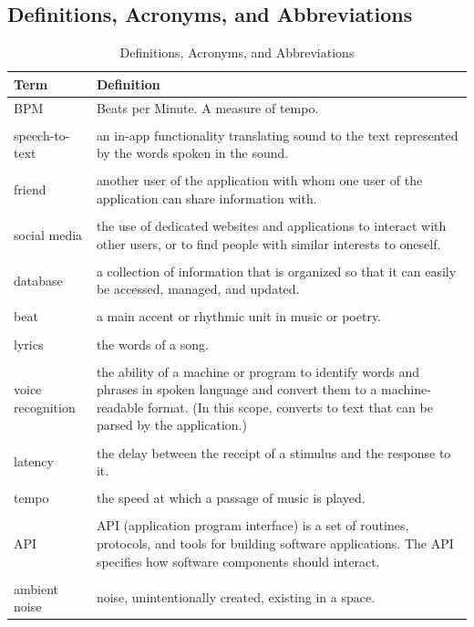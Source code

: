 \documentclass[]{article}
\begin{document}
\subsection{Definitions, Acronyms, and Abbreviations}
\label{sub:definitions_acronyms_and_abbreviations}
\cbstart
\begin{table}[!ht]
\begin{tabularx}{\linewidth}{l|X}
\textbf{Term} & \textbf{Definition} \\
\hline
BPM & Beats per Minute. A measure of tempo.\\\\

speech-to-text & an in-app functionality translating sound to the text represented by the words spoken in the sound.\\\\

friend & another user of the application with whom one user of the application can share information with.\\\\

social media & the use of dedicated websites and applications to interact with other users, or to find people with similar interests to oneself.\\\\

database & a collection of information that is organized so that it can easily be accessed, managed, and updated.\\\\

beat & a main accent or rhythmic unit in music or poetry.\\\\

lyrics & the words of a song.\\\\

voice recognition & the ability of a machine or program to identify words and phrases in spoken language and convert them to a machine-readable format. (In this scope, converts to text that can be parsed by the application.)\\\\

latency & the delay between the receipt of a stimulus and the response to it.\\\\

tempo & the speed at which a passage of music is played.\\\\

API & API (application program interface) is a set of routines, protocols, and tools for building software applications. The API specifies how software components should interact.\\\\

ambient noise & noise, unintentionally created, existing in a space.
\end{tabularx}
\caption{Definitions, Acronyms, and Abbreviations}
\end{table}
\cbend
\FloatBarrier
\end{document}
